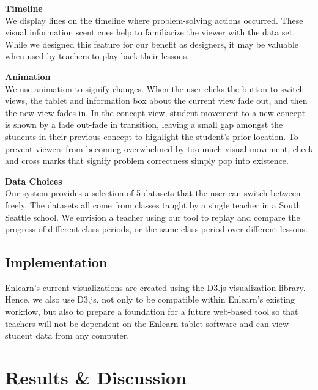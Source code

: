\documentclass{sigchi}
\begin{document}
{\bf Timeline}\\
We display lines on the timeline where problem-solving actions occurred. These visual information scent cues \cite{Willet2007} help to familiarize the viewer with the data set. While we designed this feature for our benefit as designers, it may be valuable when used by teachers to play back their lessons.

{\bf Animation}\\
We use animation to signify changes. When the user clicks the button to switch views, the tablet and information box about the current view fade out, and then the new view fades in. In the concept view, student movement to a new concept is shown by a fade out-fade in transition, leaving a small gap amongst the students in their previous concept to highlight the student's prior location. To prevent viewers from becoming overwhelmed by too much visual movement, check and cross marks that signify problem correctness simply pop into existence.

{\bf Data Choices}\\
Our system provides a selection of 5 datasets that the user can switch between freely. The datasets all come from classes taught by a single teacher in a South Seattle school. We envision a teacher using our tool to replay and compare the progress of different class periods, or the same class period over different lessons. 

\subsection{Implementation}
Enlearn's current visualizations are created using the D3.js visualization library. Hence, we also use D3.js, not only to be compatible within Enlearn's existing workflow, but also to prepare a foundation for a future web-based tool so that teachers will not be dependent on the Enlearn tablet software and can view student data from any computer.


\section{Results \& Discussion}
\end{document}
